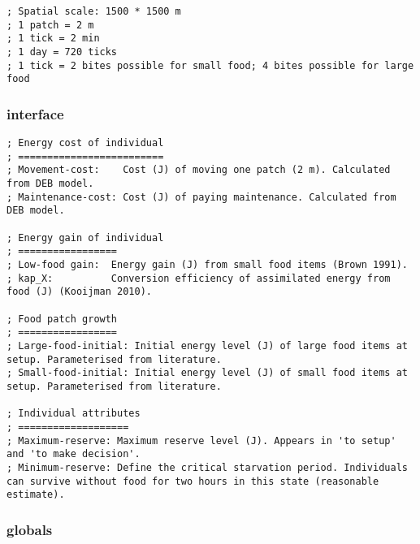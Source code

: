 \documentclass[]{article}
\begin{document}
\begin{verbatim}
; Spatial scale: 1500 * 1500 m
; 1 patch = 2 m
; 1 tick = 2 min
; 1 day = 720 ticks
; 1 tick = 2 bites possible for small food; 4 bites possible for large food
\end{verbatim}

\subsubsection{interface}\label{interface}

\begin{verbatim}
; Energy cost of individual
; =========================
; Movement-cost:    Cost (J) of moving one patch (2 m). Calculated from DEB model.
; Maintenance-cost: Cost (J) of paying maintenance. Calculated from DEB model.

; Energy gain of individual
; =================
; Low-food gain:  Energy gain (J) from small food items (Brown 1991).
; kap_X:          Conversion efficiency of assimilated energy from food (J) (Kooijman 2010).

; Food patch growth
; =================
; Large-food-initial: Initial energy level (J) of large food items at setup. Parameterised from literature.
; Small-food-initial: Initial energy level (J) of small food items at setup. Parameterised from literature.

; Individual attributes
; ===================
; Maximum-reserve: Maximum reserve level (J). Appears in 'to setup' and 'to make decision'.
; Minimum-reserve: Define the critical starvation period. Individuals can survive without food for two hours in this state (reasonable estimate). 
\end{verbatim}

\subsubsection{globals}\label{globals}
\end{document}
